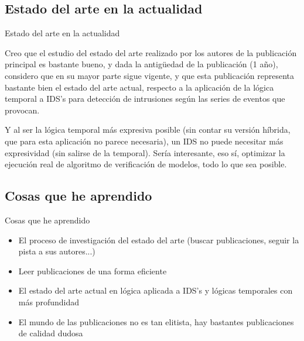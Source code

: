 \documentclass{beamer}
\begin{document}
\subsection{Estado del arte en la actualidad}

\begin{frame}{Estado del arte en la actualidad}

Creo que el estudio del estado del arte realizado por los autores de la publicación principal es bastante bueno, y dada la antigüedad de la publicación (1 año), considero que en su mayor parte sigue vigente, y que esta publicación representa bastante bien el estado del arte actual, respecto a la aplicación de la lógica temporal a IDS's para detección de intrusiones según las series de eventos que provocan.

Y al ser la lógica temporal más expresiva posible (sin contar su versión híbrida, que para esta aplicación no parece necesaria), un IDS no puede necesitar más expresividad (sin salirse de la temporal). Sería interesante, eso sí, optimizar la ejecución real de algoritmo de verificación de modelos, todo lo que sea posible.

\end{frame}

\subsection{Cosas que he aprendido}

\begin{frame}{Cosas que he aprendido}

\begin{itemize}
	\item El proceso de investigación del estado del arte (buscar publicaciones, seguir la pista a sus autores...)
\end{itemize}
\begin{itemize}
	\item Leer publicaciones de una forma eficiente
\end{itemize}
\begin{itemize}
	\item El estado del arte actual en lógica aplicada a IDS's y lógicas temporales con más profundidad
\end{itemize}
\begin{itemize}
	\item El mundo de las publicaciones no es tan elitista, hay bastantes publicaciones de calidad dudosa
\end{itemize}

\end{frame}
\end{document}

